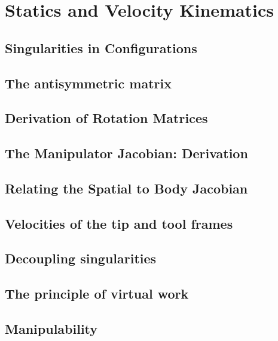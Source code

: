 \chapter{Statics and Velocity Kinematics}
\label{chap:statics}

\section{Singularities in Configurations}

\section{The antisymmetric matrix}

\section{Derivation of Rotation Matrices}

\section{The Manipulator Jacobian: Derivation}

\section{Relating the Spatial to Body Jacobian}

\section{Velocities of the tip and tool frames}

\section{Decoupling singularities}

\section{The principle of virtual work}

\section{Manipulability}